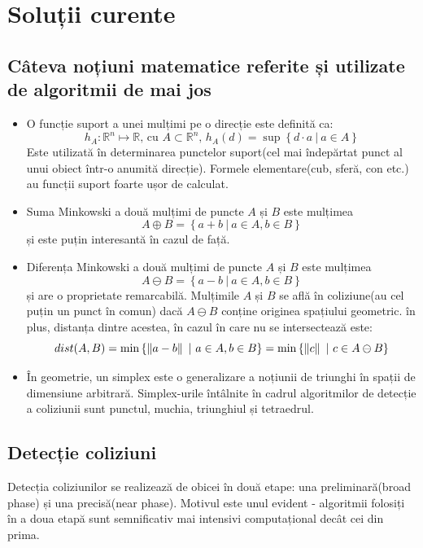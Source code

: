 \documentclass[12pt,a4paper]{report}
\begin{document}
\section{Soluții curente}
\subsection{Câteva noțiuni matematice referite și utilizate de algoritmii de mai jos}
\begin{itemize}
	\item O funcție suport a unei mulțimi pe o direcție este definită ca:
	$$ h_A:\mathbb{R}^{n} \mapsto \mathbb{R} \textrm{, cu }A \subset \mathbb{R}^{n}\textrm{,  } h_A(d) = \sup \left\lbrace d\cdot a\ |\ a\in A\right\rbrace $$
	Este utilizată în determinarea punctelor suport(cel mai îndepărtat punct al unui obiect într-o anumită direcție). Formele elementare(cub, sferă, con etc.) au funcții suport foarte ușor de calculat.
	\item Suma Minkowski a două mulțimi de puncte $A$ și $B$ este mulțimea
	$$ A \oplus B = \left\lbrace a + b\ |\ a \in A, b \in B \right\rbrace $$
	și este puțin interesantă în cazul de față.
	\item Diferența Minkowski a două mulțimi de puncte $A$ și $B$ este mulțimea
	$$ A \ominus B = \left\lbrace a - b\ |\ a \in A, b \in B \right\rbrace $$
	și are o proprietate remarcabilă. Mulțimile $A$ și $B$ se află în coliziune(au cel puțin un punct în comun) dacă $A \ominus B$ conține originea spațiului geometric. în plus, distanța dintre acestea, în cazul în care nu se intersectează este:
	$$ \centering dist(A, B) = \min \left\lbrace \left\Vert a - b \right\Vert\ |\ a \in A, b \in B \right\rbrace = \min \left\lbrace \left\Vert c \right\Vert\ |\ c \in A \ominus B \right\rbrace $$
	\item În geometrie, un simplex este o generalizare a noțiunii de triunghi în spații de dimensiune arbitrară. Simplex-urile întâlnite în cadrul algoritmilor de detecție a coliziunii sunt punctul, muchia, triunghiul și tetraedrul.
	
\end{itemize}

\subsection{Detecție coliziuni}
Detecția coliziunilor se realizează de obicei în două etape: una preliminară(broad phase) și una precisă(near phase). Motivul este unul evident - algoritmii folosiți în a doua etapă sunt semnificativ mai intensivi computațional decât cei din prima.
\end{document}
